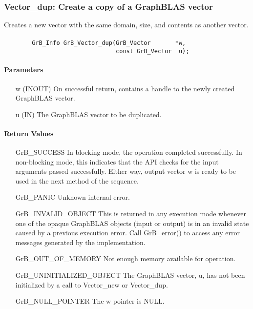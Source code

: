\subsubsection{{\sf Vector\_dup}: Create a copy of a GraphBLAS vector}

Creates a new vector with the same domain, size, and contents as another vector.

\paragraph{\syntax}

\begin{verbatim}
        GrB_Info GrB_Vector_dup(GrB_Vector       *w,
                                const GrB_Vector  u);
\end{verbatim}

\paragraph{Parameters}

\begin{itemize}[leftmargin=1.1in]
    \item[{\sf w}]  ({\sf INOUT}) On successful return, contains a handle
                                  to the newly created GraphBLAS vector.
    \item[{\sf u}]  ({\sf IN})    The GraphBLAS vector to be duplicated.
\end{itemize}

\paragraph{Return Values}

\begin{itemize}[leftmargin=2.1in]
    \item[{\sf GrB\_SUCCESS}]         In blocking mode, the operation completed
    successfully. In non-blocking mode, this indicates that the API checks 
    for the input arguments passed successfully. Either way, output vector 
    {\sf w} is ready to be used in the next method of the sequence.

    \item[{\sf GrB\_PANIC}]           Unknown internal error.
    
    \item[{\sf GrB\_INVALID\_OBJECT}] This is returned in any execution mode 
    whenever one of the opaque GraphBLAS objects (input or output) is in an invalid 
    state caused by a previous execution error.  Call {\sf GrB\_error()} to access 
    any error messages generated by the implementation.

    \item[{\sf GrB\_OUT\_OF\_MEMORY}] Not enough memory available for operation.
    
    \item[{\sf GrB\_UNINITIALIZED\_OBJECT}]  The GraphBLAS vector, {\sf u}, has 
    not been initialized by a call to {\sf Vector\_new} or {\sf Vector\_dup}.
    
    \item[{\sf GrB\_NULL\_POINTER}]  The {\sf w} pointer is {\sf NULL}.
\end{itemize}

